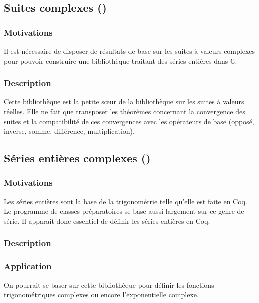 \subsection{Suites complexes ()}

\subsubsection{Motivations}

Il est nécessaire de disposer de résultats de base sur les suites à valeurs complexes pour pouvoir construire une bibliothèque traitant des séries entières dans $\mathbb{C}$.

\subsubsection{Description}

Cette bibliothèque est la petite s\oe{}ur de la bibliothèque sur les suites à valeurs réelles. Elle ne fait que transposer les théorèmes concernant la convergence des suites et la compatibilité de ces convergences avec les opérateurs de base (opposé, inverse, somme, différence, multiplication).

\subsection{Séries entières complexes ()}

\subsubsection{Motivations}

Les séries entières sont la base de la trigonométrie telle qu'elle est faite en Coq. Le programme de classes préparatoires se base aussi largement sur ce genre de série. Il apparait donc essentiel de définir les séries entières en Coq.

\subsubsection{Description}



\subsubsection{Application}

On pourrait se baser sur cette bibliothèque pour définir les fonctions trigonométriques complexes ou encore l'exponentielle complexe.

